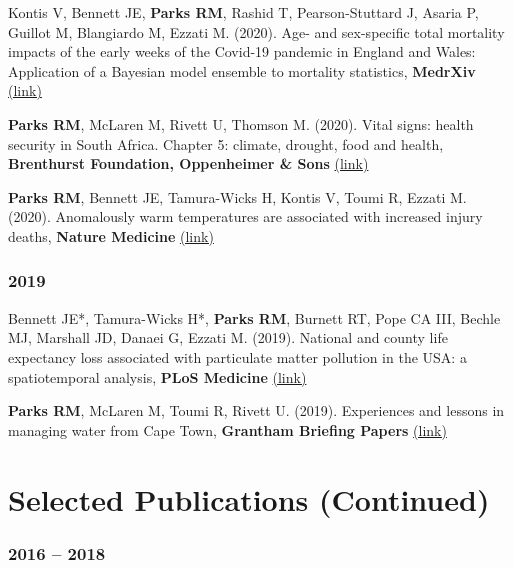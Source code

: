 \noindent Kontis V, Bennett JE, \textbf{Parks RM}, Rashid T, Pearson-Stuttard J, Asaria P, Guillot M, Blangiardo M, Ezzati M. (2020). Age- and sex-specific total mortality impacts of the early weeks of the Covid-19 pandemic in England and Wales: Application of a Bayesian model ensemble to mortality statistics, \textbf{MedrXiv} \href{https://www.medrxiv.org/content/10.1101/2020.05.20.20107680v1}{(link)} \medskip

\noindent \textbf{Parks RM}, McLaren M, Rivett U, Thomson M. (2020). Vital signs: health security in South Africa. Chapter 5: climate, drought, food and health, \textbf{Brenthurst Foundation, Oppenheimer \& Sons} \href{http://www.thebrenthurstfoundation.org/article/vital-signs-health-security-in-south-africa/}{(link)} \medskip

\noindent \textbf{Parks RM}, Bennett JE, Tamura-Wicks H, Kontis V, Toumi R, Ezzati M. (2020). Anomalously warm temperatures are associated with increased injury deaths, \textbf{Nature Medicine} \href{https://www.nature.com/articles/s41591-019-0721-y}{(link)}

\subsubsection*{2019}

\noindent Bennett JE*, Tamura-Wicks H*, \textbf{Parks RM}, Burnett RT, Pope CA III, Bechle MJ, Marshall JD, Danaei G, Ezzati M. (2019). National and county life expectancy loss associated with particulate matter pollution in the USA: a spatiotemporal analysis, \textbf{PLoS Medicine} \href{https://doi.org/10.1371/journal.pmed.1002856}{(link)} \medskip

\noindent \textbf{Parks RM}, McLaren M, Toumi R, Rivett U. (2019). Experiences and lessons in managing water from Cape Town, \textbf{Grantham Briefing Papers} \href{https://bit.ly/2Uu9oAh}{(link)}

\newpage



\section*{Selected Publications (Continued)}

\subsubsection*{2016 -- 2018}

